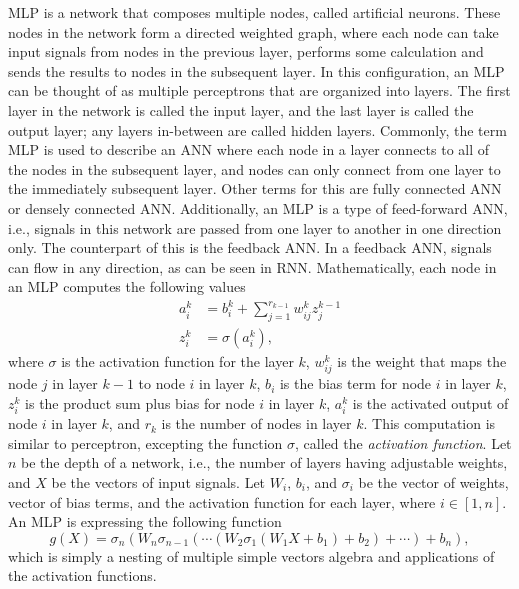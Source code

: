 \gls{MLP} is a network that composes multiple nodes, called artificial neurons.
These nodes in the network form a directed weighted graph, where each node can take input signals from nodes in the previous layer, performs some calculation and sends the results to nodes in the subsequent layer.
In this configuration, an \gls{MLP} can be thought of as multiple perceptrons that are organized into layers.
The first layer in the network is called the input layer, and the last layer is called the output layer; any layers in-between are called hidden layers.
Commonly, the term \gls{MLP} is used to describe an \gls{ANN} where each node in a layer connects to all of the nodes in the subsequent layer, and nodes can only connect from one layer to the immediately subsequent layer.
Other terms for this are fully connected \gls{ANN} or densely connected \gls{ANN}.
Additionally, an \gls{MLP} is a type of feed-forward \gls{ANN}, i.e., signals in this network are passed from one layer to another in one direction only.
The counterpart of this is the feedback \gls{ANN}.
In a feedback \gls{ANN}, signals can flow in any direction, as can be seen in \gls{RNN}.
Mathematically, each node in an \gls{MLP} computes the following values
\begin{align*}
    a_i^k &= b_i^k + \sum_{j=1}^{r_{k-1}} w_{ij}^k z_j^{k-1} \\
    z_i^k &= \sigma (a_i^k),
\end{align*}
where $\sigma$ is the activation function for the layer $k$, $w_{ij}^k$ is the weight that maps the node $j$ in layer $k - 1$ to node $i$ in layer $k$, $b_i$ is the bias term for node $i$ in layer $k$, $z_i^k$ is the product sum plus bias for node $i$ in layer $k$, $a_i^k$ is the activated output of node $i$ in layer $k$, and $r_k$ is the number of nodes in layer $k$.
This computation is similar to perceptron, excepting the function $\sigma$, called the \textit{activation function}.
Let $n$ be the depth of a network, i.e., the number of layers having adjustable weights, and $X$ be the vectors of input signals.
Let $W_i$, $b_i$, and $\sigma_i$ be the vector of weights, vector of bias terms, and the activation function for each layer, where $i \in [1, n]$.
An \gls{MLP} is expressing the following function
\begin{equation*}
    g(X) = \sigma_n(W_n \sigma_{n - 1}(\cdots (W_2 \sigma_1(W_1 X + b_1) + b_2) + \cdots) + b_n),
\end{equation*}
which is simply a nesting of multiple simple vectors algebra and applications of the activation functions.

